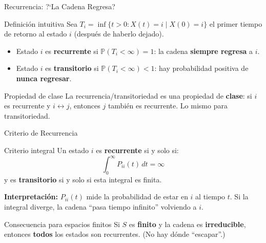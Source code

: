 \documentclass[aspectratio=1610, 10pt]{beamer}
\newcommand{\Prob}{\mathbb{P}}
\begin{document}
\begin{frame}{Recurrencia: ?`La Cadena Regresa?}
  \begin{block}{Definici\'{o}n intuitiva}
    Sea $T_i = \inf\{t > 0 : X(t) = i \mid X(0) = i\}$ el primer tiempo de retorno al estado $i$
    (despu\'{e}s de haberlo dejado).
    \begin{itemize}
      \item Estado $i$ es \textbf{recurrente} si $\Prob(T_i < \infty) = 1$:
            la cadena \textbf{siempre regresa} a $i$.
      \item Estado $i$ es \textbf{transitorio} si $\Prob(T_i < \infty) < 1$:
            hay probabilidad positiva de \textbf{nunca regresar}.
    \end{itemize}
  \end{block}

  \vspace{6pt}
  \begin{alertblock}{Propiedad de clase}
    La recurrencia/transitoriedad es una propiedad de \textbf{clase}:
    si $i$ es recurrente y $i \leftrightarrow j$, entonces $j$ tambi\'{e}n es recurrente.
    Lo mismo para transitoriedad.
  \end{alertblock}
\end{frame}

\begin{frame}{Criterio de Recurrencia}
  \begin{block}{Criterio integral}
    Un estado $i$ es \textbf{recurrente} si y solo si:
    \[
      \int_0^{\infty} P_{ii}(t)\, dt = \infty
    \]
    y es \textbf{transitorio} si y solo si esta integral es finita.
  \end{block}

  \vspace{4pt}
  \textbf{Interpretaci\'{o}n:} $P_{ii}(t)$ mide la probabilidad de estar en $i$ al tiempo $t$.
  Si la integral diverge, la cadena ``pasa tiempo infinito'' volviendo a $i$.

  \vspace{6pt}
  \begin{exampleblock}{Consecuencia para espacios finitos}
    Si $S$ es \textbf{finito} y la cadena es \textbf{irreducible}, entonces
    \textbf{todos} los estados son recurrentes. (No hay d\'{o}nde ``escapar''.)
  \end{exampleblock}
\end{frame}
\end{document}
